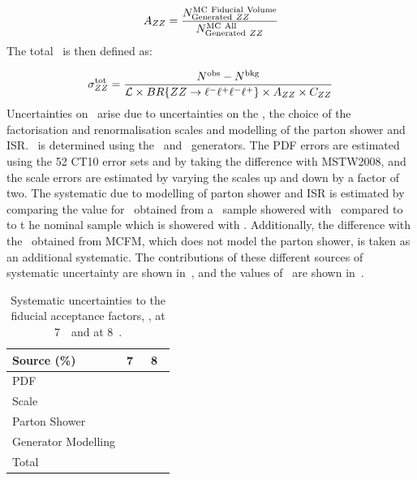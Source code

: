 \begin{equation}
\AZZ = \frac{ N^{\rm MC\ Fiducial\ Volume}_{{\rm Generated}\ ZZ} }{ N^{{\rm MC\
All}}_{{\rm Generated}\ ZZ} }
\end{equation}
The total \cx\ is then defined as:

\begin{equation}\label{eq:xsectot_fourl}
\sigma_{ZZ}^{\rm tot} = \frac{ N^{\rm obs} - N^{\rm bkg}}{\mathcal{L} \times
BR\{ZZ\rightarrow\ell^{-}\ell^{+}\ell^{-}\ell^{+}\} \times A_{ZZ} \times C_{ZZ}}
\end{equation}
Uncertainties on \AZZ\ arise due to uncertainties on the \partDF, the choice of
the factorisation and renormalisation scales and modelling of the parton shower
and ISR. \AZZ\ is determined using the \powhegbox\ and \ggtwoZZ\ generators. The
PDF errors are estimated using the 52 CT10 error sets and by taking the
difference with MSTW2008, and the scale errors are estimated by varying the scales
up and down by a factor of two. The systematic due to modelling of parton shower
and ISR is estimated by comparing the value for \AZZ\ obtained from a
\powhegbox\ sample showered with \herwig\ compared to to t he nominal sample
which is showered with \pythia. Additionally, the difference with the \AZZ\
obtained from MCFM, which does not model the parton shower, is taken as an
additional systematic. The contributions of these different sources of
systematic uncertainty are shown in~\tab{azz-syst}, and the values of \AZZ\ are
shown in~\tab{azz}.

\begin{table}
\renewcommand\arraystretch{1.1}
\centering
\small
  \begin{tabular}{lll}
    \hline\hline
     Source (\%) & 7~\tev & 8~\tev \\
    \hline
     PDF  & \ZZSevenTeVAZZPDFUncPercentage\ & \ZZEightTeVAZZPDFUncPercentage \\
     Scale  & \ZZSevenTeVAZZScaleUncPercentage\ & \ZZEightTeVAZZScaleUncPercentage \\
     Parton Shower  & \ZZSevenTeVAZZISRUncPercentage\ & \ZZEightTeVAZZISRUncPercentage \\
     Generator Modelling  & \ZZSevenTeVAZZGenUncPercentage\ & \ZZEightTeVAZZGenUncPercentage \\
     \hline
     Total  & \ZZSevenTeVAZZTotalUncPercentage\ & \ZZEightTeVAZZTotalUncPercentage \\
    \hline\hline
  \end{tabular}

      \caption[Systematic uncertainties to the fiducial acceptance factors, \AZZ, at 7~\tev\ and at 8~\tev.]
      { Systematic uncertainties to the fiducial acceptance factors, \AZZ, at
      7~\tev\ and at 8~\tev. }
    \label{table:azz-syst}
\renewcommand\arraystretch{1}
\end{table}


